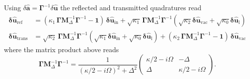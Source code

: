 Using $\delta \hat{\mathbf{a}} = \mathbf \Gamma^{-1} \delta \hat{\mathbf{u}}$ the reflected and transmitted quadratures read
\begin{equation}
  \begin{split}
  \mathbf{\delta \hat{u}_{\mathrm{ref}}} &= ( \kappa_1 \, \mathbf{\Gamma} \mathbf{M}^{-1}_\Delta \mathbf{\Gamma}^{-1}- \mathbf{1} )\, \mathbf{\delta \hat{u}_{\mathrm{in}}} +  \sqrt{\kappa_1} \,\mathbf{\Gamma}  \mathbf{M}^{-1}_\Delta \mathbf{\Gamma}^{-1} (\sqrt{\kappa_2} \mathbf{\delta \hat{u}_{\mathrm{vac}}} + \sqrt{\kappa_0}  \mathbf{\delta \hat{u}_{\mathrm{l}}} ) \\
  \mathbf{\delta \hat{u}_{\mathrm{trans}}} & =  \sqrt{\kappa_2} \,\mathbf{\Gamma}  \mathbf{M}^{-1}_\Delta \mathbf{\Gamma}^{-1} (\sqrt{\kappa_1} \mathbf{\delta \hat{u}_{\mathrm{in}}} + \sqrt{\kappa_0}  \mathbf{\delta \hat{u}_{\mathrm{l}}} ) +  (\kappa_2 \,\mathbf{\Gamma}  \mathbf{M}^{-1}_\Delta \mathbf{\Gamma}^{-1}- \mathbf{1}) \, \mathbf{\delta \hat{u}_{\mathrm{vac}}}
  \end{split}
\end{equation}
where the matrix product above reads 
\begin{equation*}
  \mathbf{\Gamma}  \mathbf{M}^{-1}_\Delta \mathbf{\Gamma}^{-1}
= \frac{1}{\left(\kappa/2-i\Omega\right)^{2}+\Delta^{2}}
\begin{pmatrix}
\kappa/2-i\Omega & -\Delta \\[6pt]
\Delta & \kappa/2-i\Omega
\end{pmatrix}.
\end{equation*}


